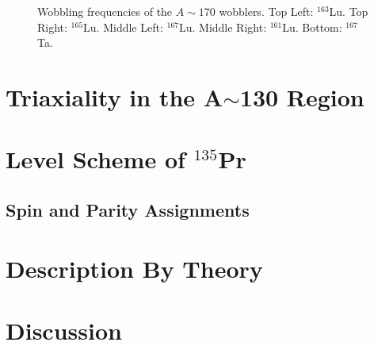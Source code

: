 \begin{figure}[t!]
	\caption{Wobbling frequencies of the $A\sim{}170$ wobblers. Top Left: $^{163}$Lu. Top Right: $^{165}$Lu. Middle Left: $^{167}$Lu. Middle Right: $^{161}$Lu. Bottom: $^{167}$Ta.\label{fig:chp4-old-wobb-freq}}
\end{figure}

\section{Triaxiality in the A$\sim$130 Region}
\label{sec:trw-triax}

\section{Level Scheme of $^{135}$Pr}
\label{sec:trw-lvl-scheme}

\subsection{Spin and Parity Assignments}
\label{ssec:trw-lvl-scheme-assignments}

\section{Description By Theory}
\label{sec:trw-theory-desc}

\section{Discussion}
\label{sec:trw-discussion}